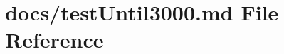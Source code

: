\hypertarget{test_until3000_8md}{}\section{docs/test\+Until3000.md File Reference}
\label{test_until3000_8md}
